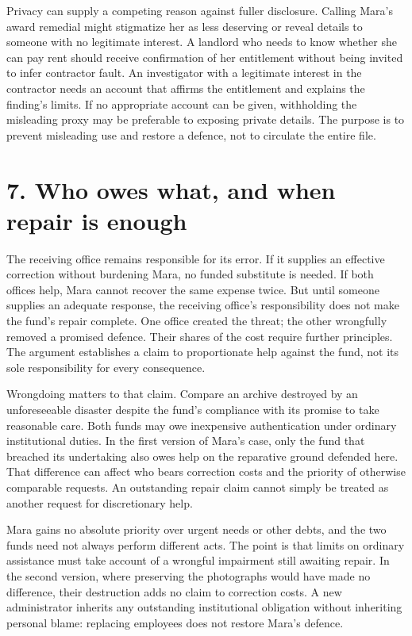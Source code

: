 Privacy can supply a competing reason against fuller disclosure. Calling Mara’s award remedial might stigmatize her as less deserving or reveal details to someone with no legitimate interest. A landlord who needs to know whether she can pay rent should receive confirmation of her entitlement without being invited to infer contractor fault. An investigator with a legitimate interest in the contractor needs an account that affirms the entitlement and explains the finding’s limits. If no appropriate account can be given, withholding the misleading proxy may be preferable to exposing private details. The purpose is to prevent misleading use and restore a defence, not to circulate the entire file.

\section*{7. Who owes what, and when repair is enough}

The receiving office remains responsible for its error. If it supplies an effective correction without burdening Mara, no funded substitute is needed. If both offices help, Mara cannot recover the same expense twice. But until someone supplies an adequate response, the receiving office’s responsibility does not make the fund’s repair complete. One office created the threat; the other wrongfully removed a promised defence. Their shares of the cost require further principles. The argument establishes a claim to proportionate help against the fund, not its sole responsibility for every consequence.

Wrongdoing matters to that claim. Compare an archive destroyed by an unforeseeable disaster despite the fund’s compliance with its promise to take reasonable care. Both funds may owe inexpensive authentication under ordinary institutional duties. In the first version of Mara’s case, only the fund that breached its undertaking also owes help on the reparative ground defended here. That difference can affect who bears correction costs and the priority of otherwise comparable requests. An outstanding repair claim cannot simply be treated as another request for discretionary help.

Mara gains no absolute priority over urgent needs or other debts, and the two funds need not always perform different acts. The point is that limits on ordinary assistance must take account of a wrongful impairment still awaiting repair. In the second version, where preserving the photographs would have made no difference, their destruction adds no claim to correction costs. A new administrator inherits any outstanding institutional obligation without inheriting personal blame: replacing employees does not restore Mara’s defence.

